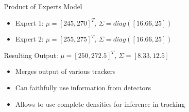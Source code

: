 \begin{frame}{Product of Experts Model}
\begin{itemize}
\item Expert 1: $\mu = [245,270]^T$, $\Sigma = diag([16.66,25])$
\item Expert 2: $\mu = [255,275]^T$, $\Sigma = diag([16.66,25])$
\end{itemize}
\begin{figure}[h]
\centering
\end{figure} 
Resulting Output: $\mu = [250,272.5]^T$, $\Sigma = [8.33,12.5]$

\begin{itemize}
\item Merges output of various trackers
\item Can faithfully use information from detectors
\item Allows to use complete densities for inference in tracking
\end{itemize}
\end{frame}


